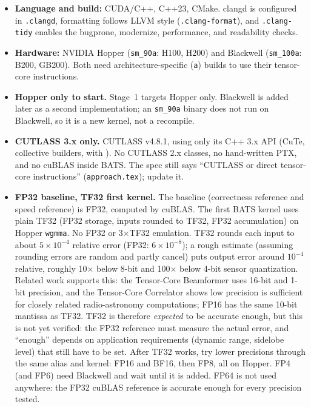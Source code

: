 \documentclass[10pt,letterpaper]{article}
\begin{document}
\begin{itemize}
  \item \textbf{Language and build:} CUDA/C++, C++23, CMake. clangd is configured in \texttt{.clangd}, formatting follows LLVM style (\texttt{.clang-format}), and \texttt{.clang-tidy} enables the bugprone, modernize, performance, and readability checks.
  \item \textbf{Hardware:} NVIDIA Hopper (\texttt{sm\_90a}: H100, H200) and Blackwell (\texttt{sm\_100a}: B200, GB200). Both need architecture-specific (\texttt{a}) builds to use their tensor-core instructions.
  \item \textbf{Hopper only to start.} Stage~1 targets Hopper only. Blackwell is added later as a second implementation; an \texttt{sm\_90a} binary does not run on Blackwell, so it is a new kernel, not a recompile.
  \item \textbf{CUTLASS 3.x only.} CUTLASS v4.8.1, using only its C++ 3.x API (CuTe, collective builders,  with ). No CUTLASS 2.x classes, no hand-written PTX, and no cuBLAS inside BATS. The spec still says ``CUTLASS or direct tensor-core instructions'' (\texttt{approach.tex}); update it.
  \item \textbf{FP32 baseline, TF32 first kernel.} The baseline (correctness reference and speed reference) is FP32, computed by cuBLAS. The first BATS kernel uses plain TF32 (FP32 storage, inputs rounded to TF32, FP32 accumulation) on Hopper \texttt{wgmma}. No FP32 or 3$\times$TF32 emulation. TF32 rounds each input to about $5 \times 10^{-4}$ relative error (FP32: $6 \times 10^{-8}$); a rough estimate (assuming rounding errors are random and partly cancel) puts output error around $10^{-4}$ relative, roughly 10$\times$ below 8-bit and 100$\times$ below 4-bit sensor quantization. Related work supports this: the Tensor-Core Beamformer uses 16-bit and 1-bit precision, and the Tensor-Core Correlator shows low precision is sufficient for closely related radio-astronomy computations; FP16 has the same 10-bit mantissa as TF32. TF32 is therefore \emph{expected} to be accurate enough, but this is not yet verified: the FP32 reference must measure the actual error, and ``enough'' depends on application requirements (dynamic range, sidelobe level) that still have to be set. After TF32 works, try lower precisions through the same alias and kernel: FP16 and BF16, then FP8, all on Hopper. FP4 (and FP6) need Blackwell and wait until it is added. FP64 is not used anywhere: the FP32 cuBLAS reference is accurate enough for every precision tested.

\end{itemize}
\end{document}

